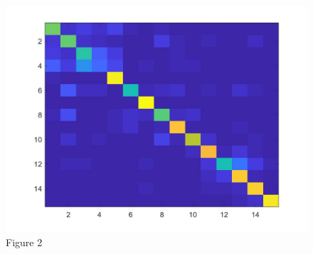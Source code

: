 \documentclass[letter, 11pt]{article}
\begin{document}
\begin{figure}[H]
        \includegraphics[width=\textwidth]{HW3/RESULT/ClassifySVM_BOW_confusion.jpg}
    \endminipage\hfill
    \caption*{Figure 2}
\end{figure}
\end{document}
